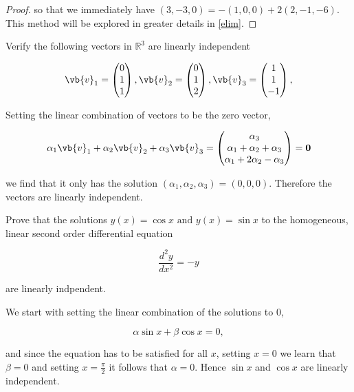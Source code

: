 \documentclass[a4paper,12pt]{report}
\begin{document}
\begin{proof}
so that we immediately have \((3,-3,0) = -(1,0,0) + 2(2,-1,-6)\). This method will be explored in greater details in \cref{elim}. 

\end{proof}


{Verify the following vectors in \(\mathbb{R}^3 \) are linearly independent 

\begin{equation}
    \vb{v} _{1} = \begin{pmatrix}
         0 \\
         1 \\
         1 \\
    \end{pmatrix}, \vb{v} _{2} = \begin{pmatrix}
         0 \\
         1 \\
         2 \\
    \end{pmatrix}, \vb{v} _{3} = \begin{pmatrix}
         1 \\
         1 \\
         -1 \\
    \end{pmatrix}, 
\end{equation}}
{Setting the linear combination of vectors to be the zero vector,

\begin{equation}
    \alpha _{1}\vb{v} _{1} + \alpha _{2} \vb{v} _{2} + \alpha _{3} \vb{v} _{3} = \begin{pmatrix}
         \alpha _{3}  \\
         \alpha _{1} + \alpha _{2} + \alpha _{3}   \\
         \alpha _{1} + 2\alpha _{2} - \alpha _{3}   \\
    \end{pmatrix} = \boldsymbol{0} 
\end{equation}

we find that it only has the solution \((\alpha _{1}, \alpha _{2}, \alpha _{3}   ) = (0,0,0)\). Therefore the vectors are linearly independent.
} 

{Prove that the solutions \(y(x) = \cos x \text { and } y(x) = \sin x\)  to the homogeneous, linear second order differential equation 

\begin{equation}
    \frac{d^2y}{dx^2} = -y
\end{equation}

are linearly indpendent.}
{We start with setting the linear combination of the solutions to 0,

\begin{equation}
    \alpha \sin x+ \beta \cos x= 0,
\end{equation}

and since the equation has to be satisfied for all \(x\),  setting \(x=0\) we learn that \(\beta =0\) and setting \(x=\frac{\pi }{2} \) it follows that \(\alpha = 0\). Hence \(\sin x\) and \(\cos x\)  are linearly independent. 
} 
\end{document}
